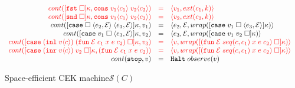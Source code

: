 \documentclass[acmsmall,review,anonymous]{acmart}\settopmatter{printfolios=true,printccs=false,printacmref=false}
\newcommand{\funrule}[3]{#1 &=& #2 & #3\\}
\newcommand{\hifunrule}[3]{\highlight{#1} &\highlight{=}& \highlight{#2} & 
\highlight{#3}\\}
\newcommand{\sOOinspect}[3]{\langle#1,#2,#3\rangle}
\newcommand{\sOOreturn}[2]{\langle#1,#2\rangle}
\newcommand{\sOOhalt}[1]{\mathtt{Halt} \; #1}
\newcommand{\kOOmt}[0]{\mathtt{stop}}
\newcommand{\kOOappII}[2]{
  [#1 \; \square]#2}
\newcommand{\kOOcar}[1]{[\mathtt{fst} \; \square]#1}
\newcommand{\kOOcdr}[1]{[\mathtt{snd} \; \square]#1}
\newcommand{\kOOcaseI}[4]{
  [\mathtt{case} \; \square \; \langle#1,#3\rangle \; \langle#2,#3\rangle ]#4}
\newcommand{\kOOcaseII}[4]{
  [\mathtt{case} \; #1 \; \square \; \langle#2,#3\rangle ]#4}
\newcommand{\kOOcaseIII}[3]{
  [\mathtt{case} \; #1 \; #2 \; \square]#3}
\newcommand{\hcvOOfun}[5]{\mathtt{fun} \; #2 \; #1 \; #3 \; #4 \; #5}
\newcommand{\hcvOOcons}[4]{\mathtt{cons}\;#1\langle#2\rangle\;#3\langle#4\rangle}
\newcommand{\hcvOOinl}[2]{\mathtt{inl}\;#1\langle#2\rangle}
\newcommand{\hcvOOinr}[2]{\mathtt{inr}\;#1\langle#2\rangle}
\newcommand{\hckOOmt}[0]{\mathtt{stop}}
\newcommand{\judgeSreduceTrans}[3]{#2 \longmapsto_{\mathcal{S}(#1)}^{*} #3}
\newcommand{\judgeSeval}[3]{eval_{\mathcal{S}(#1)}(#2) = #3}
\newcommand{\continue}[2]{cont(#2,#1)}
\newcommand{\highlight}[1]{{\color{red} #1}}
\begin{document}
\begin{figure}
\[\begin{array}{rclr}
\hifunrule{
  \continue{\hcvOOcons{v_1}{c_1}{v_2}{c_2}}{
    \kOOcar{\kappa}
  }
}{
  \sOOreturn{v_1}{ext(c_1,k)}
}{}
\hifunrule{
  \continue{\hcvOOcons{v_1}{c_1}{v_2}{c_2}}{
    \kOOcdr{\kappa}
  }
}{
  \sOOreturn{v_2}{ext(c_2,k)}
}{}

\funrule{
  \continue{v_1}{\kOOcaseI{e_2}{e_3}{\mathcal{E}}{\kappa}}
}{
  \sOOinspect{e_2}{\mathcal{E}}{
    wrap(\kOOcaseII{v_1}{e_3}{\mathcal{E}}{\kappa})
  }
}{}

\funrule{
  \continue{v_2}{
    \kOOcaseII{v_1}{e_3}{\mathcal{E}}{\kappa}
  }
}{
  \sOOinspect{e_3}{\mathcal{E}}{
  wrap(\kOOcaseIII{v_1}{v_2}{\kappa})
  }
}{}

\hifunrule{
  \continue{v_3}{
    \kOOcaseIII{(\hcvOOinl{v}{c})}{(\hcvOOfun{c_1}{\mathcal{E}}{x}{e}{c_2})}{\kappa}
  }
}{
  \sOOreturn{v}{wrap(\kOOappII{(\hcvOOfun{seq(c,c_1)}{\mathcal{E}}{x}{e}{c_2})}{\kappa})}
}{}

\hifunrule{
  \continue{(\hcvOOfun{c_1}{\mathcal{E}}{x}{e}{c_2})}
  {
    \kOOcaseIII{(\hcvOOinr{v}{c})}{v_2}{\kappa}
  }
}{
  \sOOreturn{v}{wrap(\kOOappII{(\hcvOOfun{seq(c,c_1)}{\mathcal{E}}{x}{e}{c_2})}{\kappa})}
}{}

\funrule{
  \continue{v}{\kOOmt}}{
  \sOOhalt{observe(v)}}{}
  
  \end{array}\]
  
  
  
  \caption{Space-efficient CEK machine$\mathcal{S}(C)$}
  \label{fig:machine-cekcc}
\end{figure}
\end{document}
